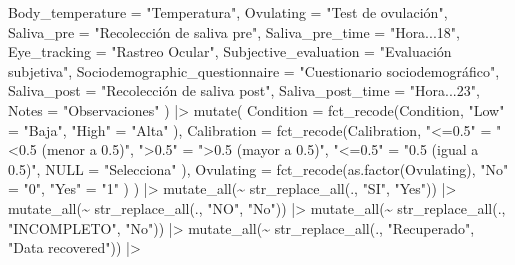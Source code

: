 \documentclass[
  bookmarksnumbered]{article}
\newenvironment{Shaded}{\begin{snugshade}}{\end{snugshade}}
\newcommand{\AttributeTok}[1]{\textcolor[rgb]{0.80,0.80,0.80}{#1}}
\newcommand{\FunctionTok}[1]{\textcolor[rgb]{0.94,0.94,0.56}{#1}}
\newcommand{\NormalTok}[1]{\textcolor[rgb]{0.80,0.80,0.80}{#1}}
\newcommand{\OtherTok}[1]{\textcolor[rgb]{0.94,0.94,0.56}{#1}}
\newcommand{\SpecialCharTok}[1]{\textcolor[rgb]{0.86,0.64,0.64}{#1}}
\newcommand{\StringTok}[1]{\textcolor[rgb]{0.80,0.58,0.58}{#1}}
\begin{document}
\begin{Shaded}
\begin{Highlighting}[]
    \AttributeTok{Body\_temperature =} \StringTok{"Temperatura"}\NormalTok{,}
    \AttributeTok{Ovulating =} \StringTok{"Test de ovulación"}\NormalTok{,}
    \AttributeTok{Saliva\_pre =} \StringTok{"Recolección de saliva pre"}\NormalTok{,}
    \AttributeTok{Saliva\_pre\_time =} \StringTok{"Hora...18"}\NormalTok{,}
    \AttributeTok{Eye\_tracking =} \StringTok{"Rastreo Ocular"}\NormalTok{,}
    \AttributeTok{Subjective\_evaluation =} \StringTok{"Evaluación subjetiva"}\NormalTok{,}
    \AttributeTok{Sociodemographic\_questionnaire =} \StringTok{"Cuestionario sociodemográfico"}\NormalTok{,}
    \AttributeTok{Saliva\_post =} \StringTok{"Recolección de saliva post"}\NormalTok{,}
    \AttributeTok{Saliva\_post\_time =} \StringTok{"Hora...23"}\NormalTok{,}
    \AttributeTok{Notes =} \StringTok{"Observaciones"}
\NormalTok{  ) }\SpecialCharTok{|\textgreater{}}
  \FunctionTok{mutate}\NormalTok{(}
    \AttributeTok{Condition =} \FunctionTok{fct\_recode}\NormalTok{(Condition,}
      \StringTok{"Low"} \OtherTok{=} \StringTok{"Baja"}\NormalTok{,}
      \StringTok{"High"} \OtherTok{=} \StringTok{"Alta"}
\NormalTok{    ),}
    \AttributeTok{Calibration =} \FunctionTok{fct\_recode}\NormalTok{(Calibration,}
      \StringTok{"\textless{}=0.5"} \OtherTok{=} \StringTok{"\textless{}0.5 (menor a 0.5)"}\NormalTok{,}
      \StringTok{"\textgreater{}0.5"} \OtherTok{=} \StringTok{"\textgreater{}0.5 (mayor a 0.5)"}\NormalTok{,}
      \StringTok{"\textless{}=0.5"} \OtherTok{=} \StringTok{"0.5 (igual a 0.5)"}\NormalTok{,}
      \AttributeTok{NULL =} \StringTok{"Selecciona"}
\NormalTok{    ),}
    \AttributeTok{Ovulating =} \FunctionTok{fct\_recode}\NormalTok{(}\FunctionTok{as.factor}\NormalTok{(Ovulating),}
      \StringTok{"No"} \OtherTok{=} \StringTok{"0"}\NormalTok{,}
      \StringTok{"Yes"} \OtherTok{=} \StringTok{"1"}
\NormalTok{    )}
\NormalTok{  ) }\SpecialCharTok{|\textgreater{}}
  \FunctionTok{mutate\_all}\NormalTok{(}\SpecialCharTok{\textasciitilde{}} \FunctionTok{str\_replace\_all}\NormalTok{(., }\StringTok{"SI"}\NormalTok{, }\StringTok{"Yes"}\NormalTok{)) }\SpecialCharTok{|\textgreater{}}
  \FunctionTok{mutate\_all}\NormalTok{(}\SpecialCharTok{\textasciitilde{}} \FunctionTok{str\_replace\_all}\NormalTok{(., }\StringTok{"NO"}\NormalTok{, }\StringTok{"No"}\NormalTok{)) }\SpecialCharTok{|\textgreater{}}
  \FunctionTok{mutate\_all}\NormalTok{(}\SpecialCharTok{\textasciitilde{}} \FunctionTok{str\_replace\_all}\NormalTok{(., }\StringTok{"INCOMPLETO"}\NormalTok{, }\StringTok{"No"}\NormalTok{)) }\SpecialCharTok{|\textgreater{}}
  \FunctionTok{mutate\_all}\NormalTok{(}\SpecialCharTok{\textasciitilde{}} \FunctionTok{str\_replace\_all}\NormalTok{(., }\StringTok{"Recuperado"}\NormalTok{, }\StringTok{"Data recovered"}\NormalTok{)) }\SpecialCharTok{|\textgreater{}}

\end{Highlighting}
\end{Shaded}
\end{document}
